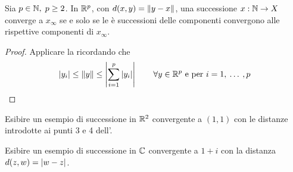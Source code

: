 \begin{proposition}
	\label{prop:succ_conv_se_comp_conv}
	Sia $p \in \mathbb{N},\; p \geq 2$. In $\mathbb{R}^p$, con $d(x,y) = \left\|y-x\right\|$, una successione $x: \mathbb{N} \to X$ converge a $x_\infty$ se e solo se le $è$ successioni delle componenti convergono alle rispettive componenti di $x_\infty$.
	\begin{proof}
		Applicare la  ricordando che
		\[\left|y_i\right| \leq \left\|y\right\| \leq \left|\sum\limits_{i = 1}^p \left|y_i\right|\right| \qquad \forall y \in \mathbb{R}^p \text{ e per } i = 1,\:\dotsc\:,p\]
	\end{proof}
\end{proposition}
\begin{exercise}
	Esibire un esempio di successione in $\mathbb{R}^2$ convergente a $(1,1)$ con le distanze introdotte ai punti 3 e 4 dell'.
\end{exercise}
\begin{exercise}
	Esibire un esempio di successione in $\mathbb{C}$ convergente a $1+i$ con la distanza $d(z,w) = \left|w-z\right|$.
\end{exercise}
